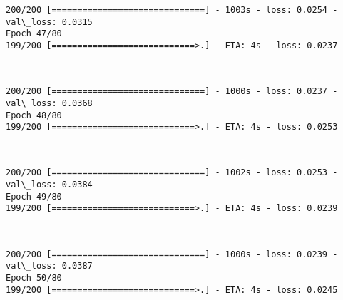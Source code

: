 \documentclass[11pt]{article}
\begin{document}
    \begin{Verbatim}[commandchars=\\\{\}]
200/200 [==============================] - 1003s - loss: 0.0254 - val\_loss: 0.0315
Epoch 47/80
199/200 [============================>.] - ETA: 4s - loss: 0.0237
    \end{Verbatim}

    \begin{center}
    \end{center}
    { \hspace*{\fill} \\}
    
    \begin{Verbatim}[commandchars=\\\{\}]
200/200 [==============================] - 1000s - loss: 0.0237 - val\_loss: 0.0368
Epoch 48/80
199/200 [============================>.] - ETA: 4s - loss: 0.0253
    \end{Verbatim}

    \begin{center}
    \end{center}
    { \hspace*{\fill} \\}
    
    \begin{Verbatim}[commandchars=\\\{\}]
200/200 [==============================] - 1002s - loss: 0.0253 - val\_loss: 0.0384
Epoch 49/80
199/200 [============================>.] - ETA: 4s - loss: 0.0239
    \end{Verbatim}

    \begin{center}
    \end{center}
    { \hspace*{\fill} \\}
    
    \begin{Verbatim}[commandchars=\\\{\}]
200/200 [==============================] - 1000s - loss: 0.0239 - val\_loss: 0.0387
Epoch 50/80
199/200 [============================>.] - ETA: 4s - loss: 0.0245
    \end{Verbatim}

    \begin{center}
    \end{center}
    { \hspace*{\fill} \\}
    
\end{document}
